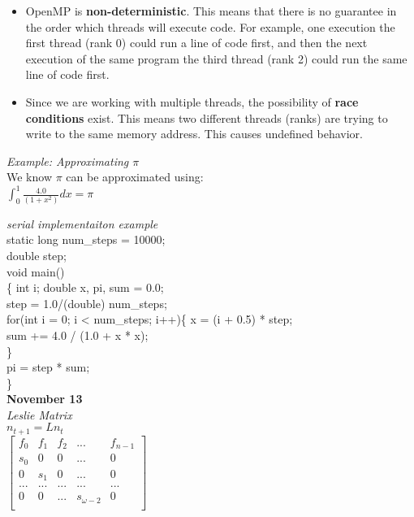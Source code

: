 \documentclass[10pt, AMS Euler]{article}
\begin{document}
\begin{itemize}
  \item OpenMP is \textbf{non-deterministic}. This means that there is no guarantee in the order which threads will execute code. For example, one execution the first thread (rank 0) could run a line of code first, and then the next execution of the same program the third thread (rank 2) could run the same line of code first.
  \item Since we are working with multiple threads, the possibility of \textbf{race conditions} exist. This means two different threads (ranks) are trying to write to the same memory address. This causes undefined behavior.
\end{itemize}

\textit{Example: Approximating $\pi$}\\
We know $\pi$ can be approximated using:\\
$ \int_0^1 \frac{4.0}{(1 + x^2)} dx = \pi $\\

\newpage

\textit{serial implementaiton example}\\

static long num\_steps = 10000;\\
double step;\\
void main()\\
\{ int i; double x, pi, sum = 0.0;\\
step = 1.0/(double) num\_steps;\\

for(int i = 0; i < num\_steps; i++)\{
  x = (i + 0.5) * step;\\
  sum += 4.0 / (1.0 + x * x);\\
\}\\
pi = step * sum;\\
\}\\


\textbf{November 13}\\

\textit{Leslie Matrix}\\

$n_{t+1} = L n_t$\\
$
\begin{bmatrix}
  f_0 & f_1 & f_2 & ... & f_{n - 1}\\
  s_0 & 0 & 0 & ... & 0\\
  0 & s_1 & 0 & ... & 0\\
  ... & ... & ... & ... & ...\\
  0 & 0 & ... & s_{\omega - 2} & 0\\
\end{bmatrix}
$
\end{document}
